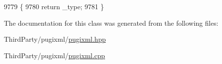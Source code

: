 \begin{DoxyCode}
9779     \{
9780         \textcolor{keywordflow}{return} \_type;
9781     \}
\end{DoxyCode}


The documentation for this class was generated from the following files\-:\begin{DoxyCompactItemize}
\item 
Third\-Party/pugixml/\hyperlink{pugixml_8hpp}{pugixml.\-hpp}\item 
Third\-Party/pugixml/\hyperlink{pugixml_8cpp}{pugixml.\-cpp}\end{DoxyCompactItemize}

